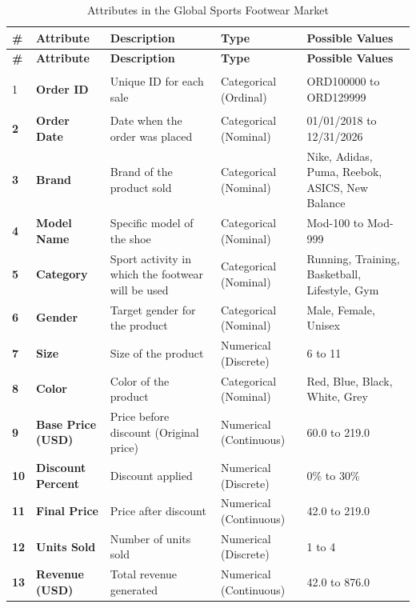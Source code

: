 \documentclass[12pt]{article}
\begin{document}
\begin{longtable}{|>{\bfseries}p{0.5cm}|>{\bfseries}p{2.0cm}|p{4cm}|p{3cm}|p{4cm}|}

\caption{Attributes in the Global Sports Footwear Market}
\label{tab:attributes} \\

\hline
\textbf{\#} & \textbf{Attribute} & \textbf{Description} & \textbf{Type} & \textbf{Possible Values} \\
\hline
\endfirsthead

\hline
\textbf{\#} & \textbf{Attribute} & \textbf{Description} & \textbf{Type} & \textbf{Possible Values} \\
\hline
\endhead

\hline
\endfoot

\hline
\endlastfoot

1 & Order ID & Unique ID for each sale & Categorical (Ordinal) & ORD100000 to ORD129999 \\
\hline
2 & Order Date & Date when the order was placed & Categorical (Nominal) & 01/01/2018 to 12/31/2026 \\
\hline
3 & Brand & Brand of the product sold & Categorical (Nominal) & Nike, Adidas, Puma, Reebok, ASICS, New Balance \\
\hline
4 & Model Name & Specific model of the shoe & Categorical (Nominal) & Mod-100 to Mod-999 \\
\hline
5 & Category & Sport activity in which the footwear will be used & Categorical (Nominal) & Running, Training, Basketball, Lifestyle, Gym \\
\hline
6 & Gender & Target gender for the product & Categorical (Nominal) & Male, Female, Unisex \\
\hline
7 & Size & Size of the product & Numerical (Discrete) & 6 to 11 \\
\hline
8 & Color & Color of the product & Categorical (Nominal) & Red, Blue, Black, White, Grey \\
\hline
9 & Base Price (USD) & Price before discount (Original price) & Numerical (Continuous) & 60.0 to 219.0 \\
\hline
10 & Discount Percent & Discount applied & Numerical (Discrete) & 0\% to 30\% \\
\hline
11 & Final Price & Price after discount & Numerical (Continuous) & 42.0 to 219.0 \\
\hline
12 & Units Sold & Number of units sold & Numerical (Discrete) & 1 to 4 \\
\hline
13 & Revenue (USD) & Total revenue generated & Numerical (Continuous) & 42.0 to 876.0 \\

\end{longtable}
\end{document}
